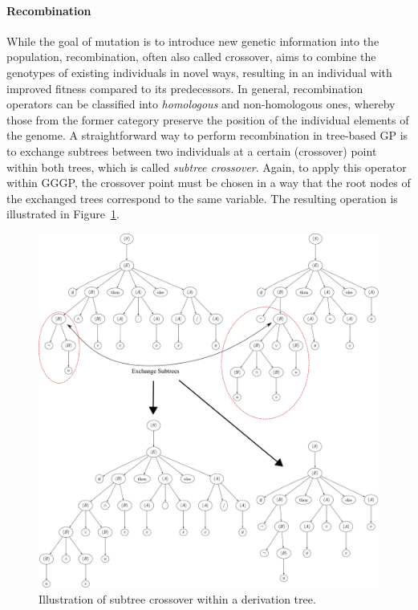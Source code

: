 \paragraph{Recombination}
While the goal of mutation is to introduce new genetic information into the population, recombination, often also called crossover, aims to combine the genotypes of existing individuals in novel ways, resulting in an individual with improved fitness compared to its predecessors.
In general, recombination operators can be classified into \emph{homologous} and non-homologous ones, whereby those from the former category preserve the position of the individual elements of the genome.
A straightforward way to perform recombination in tree-based GP is to exchange subtrees between two individuals at a certain (crossover) point within both trees, which is called \emph{subtree crossover}.
Again, to apply this operator within GGGP, the crossover point must be chosen in a way that the root nodes of the exchanged trees correspond to the same variable.
The resulting operation is illustrated in Figure~\ref{fig:gp-subtree-crossover}.  
\begin{figure}
	\centering
	\includegraphics[scale=0.4]{figures/trees/subtree_crossover.pdf}
	\caption{Illustration of subtree crossover within a derivation tree.}
	\label{fig:gp-subtree-crossover}
\end{figure}
